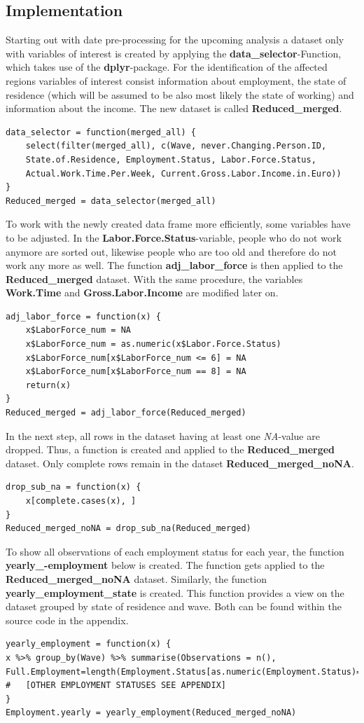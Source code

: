 \documentclass[a4paper]{article}
\begin{document}
\subsection{Implementation}
Starting out with date pre-processing for the upcoming analysis a dataset only with variables of interest is created by applying the \textbf{data\_selector}-Function, which takes use of the \textbf{dplyr}-package. For the identification of the affected regions variables of interest consist information about employment, the state of residence (which will be assumed to be also most likely the state of working) and information about the income. The new dataset is called \textbf{Reduced\_merged}.
\begin{lstlisting}
data_selector = function(merged_all) {
    select(filter(merged_all), c(Wave, never.Changing.Person.ID, 
    State.of.Residence, Employment.Status, Labor.Force.Status, 
    Actual.Work.Time.Per.Week, Current.Gross.Labor.Income.in.Euro))
}
Reduced_merged = data_selector(merged_all)
\end{lstlisting}

To work with the newly created data frame more efficiently, some variables have to be adjusted. In the \textbf{Labor.Force.Status}-variable, people who do not work anymore are sorted out, likewise people who are too old and therefore do not work any more as well. The function \textbf{adj\_labor\_force} is then applied to the \textbf{Reduced\_merged} dataset.
With the same procedure, the variables \textbf{Work.Time} and \textbf{Gross.Labor.Income} are modified later on. 
\begin{lstlisting}
adj_labor_force = function(x) {
    x$LaborForce_num = NA
    x$LaborForce_num = as.numeric(x$Labor.Force.Status)
    x$LaborForce_num[x$LaborForce_num <= 6] = NA
    x$LaborForce_num[x$LaborForce_num == 8] = NA
    return(x)
}
Reduced_merged = adj_labor_force(Reduced_merged)
\end{lstlisting}

In the next step, all rows in the dataset having at least one \textit{NA}-value are dropped. Thus, a function is created and applied to the \textbf{Reduced\_merged} dataset. Only complete rows remain in the dataset \textbf{Reduced\_merged\_noNA}. 
\begin{lstlisting}
drop_sub_na = function(x) {
    x[complete.cases(x), ]
}
Reduced_merged_noNA = drop_sub_na(Reduced_merged)
\end{lstlisting}

To show all observations of each employment status for each year, the function \textbf{yearly\_-employment} below is created. 
The function gets applied to the \textbf{Reduced\_merged\_noNA} dataset. 
Similarly, the function \textbf{yearly\_employment\_state} is created. This function provides a view on the dataset grouped by state of residence and wave. Both can be found within the source code in the appendix.
\begin{lstlisting}
yearly_employment = function(x) {
x %>% group_by(Wave) %>% summarise(Observations = n(), 
Full.Employment=length(Employment.Status[as.numeric(Employment.Status)==7]), 
#	[OTHER EMPLOYMENT STATUSES SEE APPENDIX]
}
Employment.yearly = yearly_employment(Reduced_merged_noNA)
\end{lstlisting}
\end{document}
